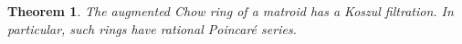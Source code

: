 \documentclass[11pt, reqno]{amsart}
\DeclareMathOperator{\aChow}{CH}             		%
\DeclareMathOperator{\coat}{coat}
\renewcommand{\emptyset}{\varnothing}
\DeclareMathOperator{\rk}{rk}
\newtheorem{thm}{Theorem}[section]
\theoremstyle{definition}
\numberwithin{equation}{section}
\numberwithin{table}{section}
\begin{document}
\begin{spacing}{1.1}
%

\begin{thm} \label{augmented:Chow:rings:of:matroids:are:Koszul}
The augmented Chow ring of a matroid has a Koszul filtration.  In particular, such rings have rational Poincar\'e series.
\end{thm}


\end{spacing}
\end{document}
